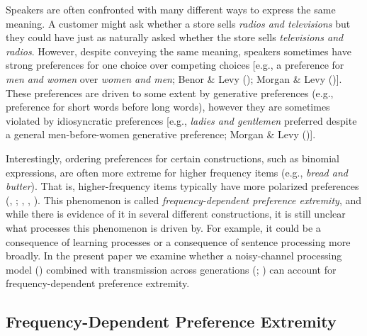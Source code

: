 \documentclass[
  12pt,
  letterpaper,
]{scrreprt}
\begin{document}
Speakers are often confronted with many different ways to express the
same meaning. A customer might ask whether a store sells \emph{radios
and televisions} but they could have just as naturally asked whether the
store sells \emph{televisions and radios}. However, despite conveying
the same meaning, speakers sometimes have strong preferences for one
choice over competing choices {[}e.g., a preference for
\emph{men and women} over \emph{women and men}; Benor \& Levy
(); Morgan \& Levy
(){]}. These
preferences are driven to some extent by generative preferences (e.g.,
preference for short words before long words), however they are
sometimes violated by idiosyncratic preferences {[}e.g.,
\emph{ladies and
gentlemen} preferred despite a general men-before-women generative
preference; Morgan \& Levy
(){]}.

Interestingly, ordering preferences for certain constructions, such as
binomial expressions, are often more extreme for higher frequency items
(e.g., \emph{bread and butter}). That is, higher-frequency items
typically have more polarized preferences
(,
;
,
,
).
This phenomenon is called
\emph{frequency-dependent preference extremity}, and while there is
evidence of it in several different constructions, it is still unclear
what processes this phenomenon is driven by. For example, it could be a
consequence of learning processes or a consequence of sentence
processing more broadly. In the present paper we examine whether a
noisy-channel processing model
() combined with transmission across generations
(; ) can account for frequency-dependent preference
extremity.

\subsection{Frequency-Dependent Preference
Extremity}\label{frequency-dependent-preference-extremity}
\end{document}
